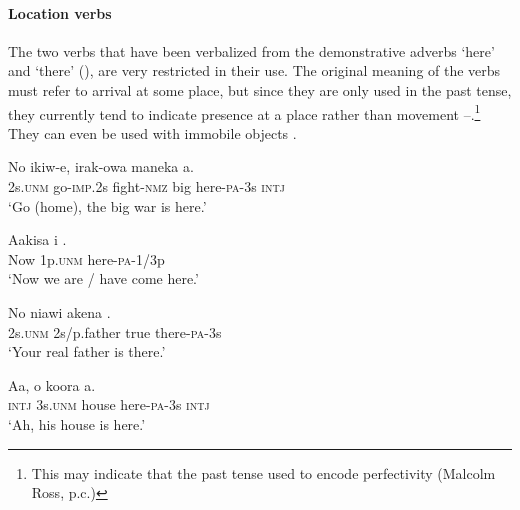 \paragraph{Location verbs}\label{sec:3.8.4.4.3}
{}
The two verbs that have been verbalized from the demonstrative adverbs  `here' and  `there' (), are very restricted in their use. The original meaning of the verbs must refer to arrival at some place, but since they are only used in the past tense, they currently tend to indicate presence at a place rather than movement --.\footnote{This may indicate that the past tense used to encode perfectivity (Malcolm Ross, p.c.)} They can even be used with immobile objects . 

\ea%
\label{ex:3:x1270}
\gll No ikiw-e, irak-owa maneka \textstyleEmphasizedVernacularWords{-}\textstyleEmphasizedVernacularWords{-} a. \\
2s.\textsc{unm} go-\textsc{imp}.2s fight-\textsc{nmz} big here-\textsc{pa}-3s \textsc{intj}\\
\glt`Go (home), the big war is here.'
\z

\ea%
\label{ex:3:x1271}
\gll Aakisa i . \\
Now 1p.\textsc{unm} here-\textsc{pa}-1/3p \\
\glt`Now we are / have come here.'
\z

\ea%
\label{ex:3:x1272}
\gll No niawi akena . \\
2s.\textsc{unm} 2s/p.father true there-\textsc{pa}-3s\\
\glt`Your real father is there.'
\z

\ea%
\label{ex:3:x1276}
\gll Aa, o koora  a. \\
\textsc{intj} 3s.\textsc{unm} house here-\textsc{pa}-3s \textsc{intj}\\
\glt`Ah, his house is here.'
\z

